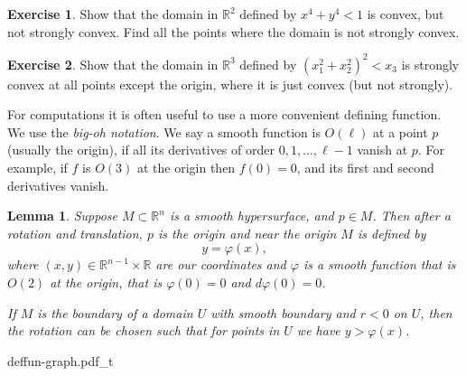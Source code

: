 \documentclass[12pt,openany]{book}
\newcommand{\R}{{\mathbb{R}}}
\newcommand{\myindex}[1]{#1\index{#1}}
\theoremstyle{plain}
\newtheorem{lemma}[thm]{Lemma}
\theoremstyle{remark}
\theoremstyle{definition}
\newenvironment{exbox}{%
    \def\FrameCommand{\vrule width 1pt \relax\hspace {10pt}}%
    \MakeFramed {\advance \hsize -\width \FrameRestore }%
}{%
    \endMakeFramed
}
\theoremstyle{exercise}
\newtheorem{exercise}{Exercise}[section]
\theoremstyle{example}
\begin{document}
\begin{exbox}
\begin{exercise}
Show that the domain in $\R^2$ defined by $x^4+y^4 < 1$ is convex, but not strongly convex.
Find all the points where the domain is not strongly convex.
\end{exercise}

\begin{exercise}
Show that the domain in $\R^3$ defined by ${(x_1^2+x_2^2)}^2 < x_3$ is
strongly convex at all points except the origin, where it is just convex
(but not strongly).
\end{exercise}
\end{exbox}

For computations it is often useful to use a more convenient
defining function.
We use the \emph{\myindex{big-oh notation}}.
We say a smooth function is $O(\ell)$ at a point $p$ (usually the origin),
if all its derivatives of order $0, 1, \ldots,  \ell-1$ vanish at $p$.
For example, if $f$ is $O(3)$ at the origin
then $f(0)=0$, and its first and second derivatives vanish.

\begin{lemma} \label{lemma:realgraphcoords}
Suppose $M \subset \R^n$ is a smooth hypersurface, %
and $p \in M$.  Then after a rotation and translation, 
$p$ is the origin and near the origin $M$ is defined by
\begin{equation*}
y = \varphi(x) ,
\end{equation*}
where $(x,y) \in \R^{n-1} \times \R$ are our coordinates and
$\varphi$ is a smooth %
function that is $O(2)$ at the origin,
that is $\varphi(0) = 0$ and $d\varphi(0) = 0$.

If $M$ is the boundary of a domain $U$ with smooth boundary and
$r < 0$ on $U$,
then the rotation can be chosen
such that for points in $U$ we have $y > \varphi(x)$.
\end{lemma}


\begin{center}
{deffun-graph.pdf_t}
\end{center}

\end{document}

